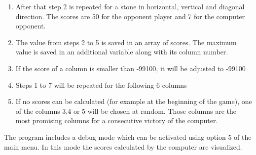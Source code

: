 \documentclass[10pt,a4paper,titlepage]{article}
\begin{document}
\begin{enumerate}
	\item After that step 2 is repeated for a stone in horizontal, vertical and diagonal direction. The scores are 50 for the opponent player and 7 for the computer opponent. 
	\item The value from steps 2 to 5 is saved in an array of scores. The maximum value is saved in an additional variable along with its column number.
	\item If the score of a column is smaller than -99100, it will be adjusted to -99100
	\item Steps 1 to 7 will be repeated for the following 6 columns
	\item If no scores can be calculated (for example at the beginning of the game), one of the columns 3,4 or 5 will be chosen at random. Those columns are the most promising columns for a consecutive victory of the computer.
\end{enumerate}
The program includes a debug mode which can be activated using option 5 of the main menu. In this mode the scores calculated by the computer are visualized.
\end{document}
